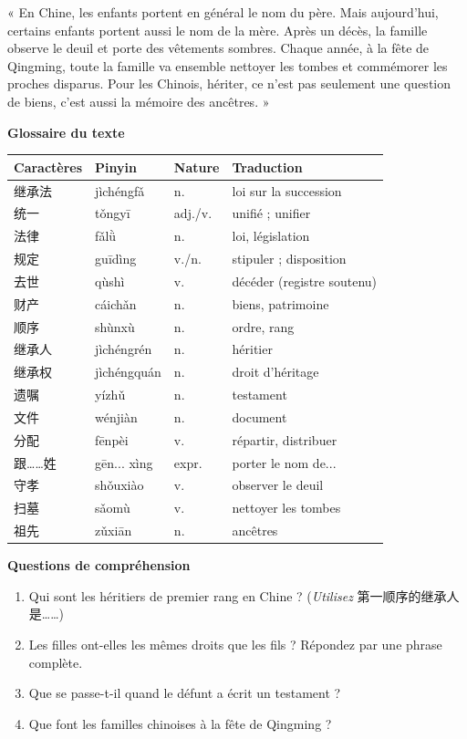 \documentclass[11pt]{article}
\begin{document}
\begin{textebox}
« En Chine, les enfants portent en général le nom du père. Mais aujourd'hui, certains enfants portent aussi le nom de la mère. Après un décès, la famille observe le deuil et porte des vêtements sombres. Chaque année, à la fête de Qingming, toute la famille va ensemble nettoyer les tombes et commémorer les proches disparus. Pour les Chinois, hériter, ce n'est pas seulement une question de biens, c'est aussi la mémoire des ancêtres. »
\end{textebox}

\textbf{Glossaire du texte}\par

\begin{center}
\begin{tabularx}{\linewidth}{|X|X|X|X|}
\hline
\rowcolor{popblueL} Caractères & Pinyin & Nature & Traduction \\
\hline
继承法 & jìchéngfǎ & n. & loi sur la succession \\
\hline
统一 & tǒngyī & adj./v. & unifié ; unifier \\
\hline
法律 & fǎlǜ & n. & loi, législation \\
\hline
规定 & guīdìng & v./n. & stipuler ; disposition \\
\hline
去世 & qùshì & v. & décéder (registre soutenu) \\
\hline
财产 & cáichǎn & n. & biens, patrimoine \\
\hline
顺序 & shùnxù & n. & ordre, rang \\
\hline
继承人 & jìchéngrén & n. & héritier \\
\hline
继承权 & jìchéngquán & n. & droit d'héritage \\
\hline
遗嘱 & yízhǔ & n. & testament \\
\hline
文件 & wénjiàn & n. & document \\
\hline
分配 & fēnpèi & v. & répartir, distribuer \\
\hline
跟……姓 & gēn... xìng & expr. & porter le nom de... \\
\hline
守孝 & shǒuxiào & v. & observer le deuil \\
\hline
扫墓 & sǎomù & v. & nettoyer les tombes \\
\hline
祖先 & zǔxiān & n. & ancêtres \\
\hline
\end{tabularx}
\end{center}

\textbf{Questions de compréhension}\par
\begin{enumerate}
\item Qui sont les héritiers de premier rang en Chine ? (\emph{Utilisez} 第一顺序的继承人是……)
\item Les filles ont-elles les mêmes droits que les fils ? Répondez par une phrase complète.
\item Que se passe-t-il quand le défunt a écrit un testament ?
\item Que font les familles chinoises à la fête de Qingming ?
\end{enumerate}
\end{document}
